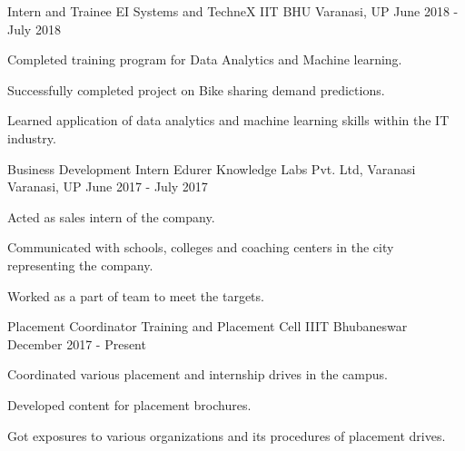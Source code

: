 

\begin{cventries}

  \cventry
    {Intern and Trainee} %
    {EI Systems and TechneX IIT BHU} %
    {Varanasi, UP} %
    {June 2018 - July 2018} %
    {
      \begin{cvitems} %
        \item {Completed training program for Data Analytics and Machine learning.}
        \item {Successfully completed project on Bike sharing demand predictions.}
        \item {Learned application of data analytics and machine learning skills within the IT industry.}
      \end{cvitems}
    }
    
  \cventry
    {Business Development Intern} %
    {Edurer Knowledge Labs Pvt. Ltd, Varanasi} %
    {Varanasi, UP} %
    {June 2017 - July 2017} %
    {
      \begin{cvitems} %
        \item {Acted as sales intern of the company.}
        \item {Communicated with schools, colleges and coaching centers in the city representing the company.}
        \item {Worked as a part of team to meet the targets.}
      \end{cvitems}
    }
    
  \cventry
    {Placement Coordinator} %
    {Training and Placement Cell} %
    {IIIT Bhubaneswar} %
    {December 2017 - Present} %
    {
      \begin{cvitems} %
        \item {Coordinated various placement and internship drives in the campus.}
        \item {Developed content for placement brochures.}
        \item {Got exposures to various organizations and its procedures of placement drives.}
      \end{cvitems}
    }

\end{cventries}
